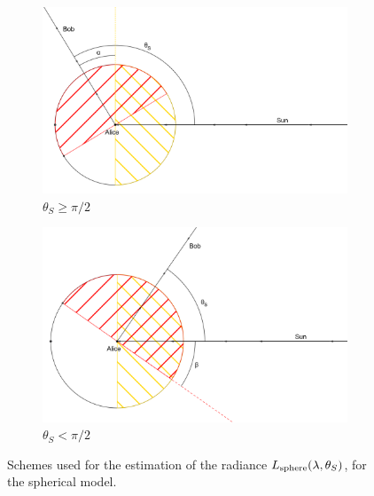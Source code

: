 \documentclass[twocolumn]{article}
\begin{document}
	\begin{figure}[t]
		\centering
		\begin{subfigure}[b]{\linewidth}
			\includegraphics[width=\linewidth]{schema1.png}
			\caption{$\theta_S\geq \pi/2$}
			\label{fig:schema1}
		\end{subfigure}
		\begin{subfigure}[b]{\linewidth}
			\includegraphics[width=\linewidth]{schema2.png}
			\caption{$\theta_S < \pi/2$}
			\label{fig:schema2}
		\end{subfigure}
		\caption{Schemes used for the estimation of the radiance $L_{\rm sphere}(\lambda,\theta_S)$, for the spherical model.}\label{fig:schemisfera}
	\end{figure}
	
\end{document}
